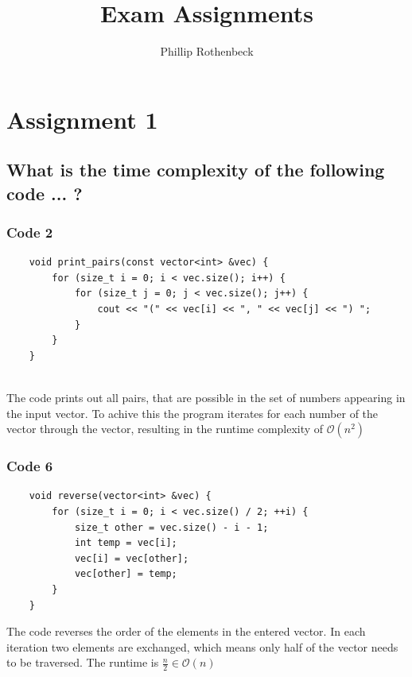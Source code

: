 \documentclass[runningheads]{llncs}
\begin{document}
\title{Exam Assignments}

\author{Phillip Rothenbeck}

\maketitle

\section*{Assignment 1}

\subsection*{What is the time complexity of the following code ... ?}%

\subsubsection*{Code 2} \label{1:1:code2}
\begin{verbatim}
    void print_pairs(const vector<int> &vec) {
        for (size_t i = 0; i < vec.size(); i++) {
            for (size_t j = 0; j < vec.size(); j++) {
                cout << "(" << vec[i] << ", " << vec[j] << ") ";
            }
        }
    }
    
\end{verbatim}
The code prints out all pairs, that are possible in the set of numbers appearing in the input vector. To achive this
the program iterates for each number of the vector through the vector, resulting in the runtime complexity of
$\mathcal{O}(n^2)$

\subsubsection*{Code 6}
\begin{verbatim}
    void reverse(vector<int> &vec) {
        for (size_t i = 0; i < vec.size() / 2; ++i) {
            size_t other = vec.size() - i - 1;
            int temp = vec[i];
            vec[i] = vec[other];
            vec[other] = temp;
        }
    }
\end{verbatim}
The code reverses the order of the elements in the entered vector. In each iteration two elements are exchanged,
which means only half of the vector needs to be traversed. The runtime is $\frac{n}{2} \in \mathcal{O}(n)$
\end{document}
